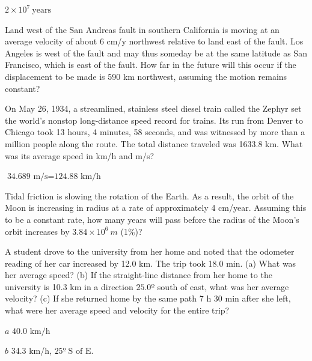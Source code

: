 \documentclass[
]{book}
\begin{document}
\leavevmode{}%
\({{2 \times \text{10}^{7}}\ \text{years}}{}\)

\hypertarget{fs-id2572316}{}
\leavevmode{}%
Land west of the San Andreas fault in southern California is moving at
an average velocity of about 6 cm/y northwest relative to land east of
the fault. Los Angeles is west of the fault and may thus someday be at
the same latitude as San Francisco, which is east of the fault. How far
in the future will this occur if the displacement to be made is 590 km
northwest, assuming the motion remains constant?

\hypertarget{fs-id1403452}{}
\leavevmode{}%
On May 26, 1934, a streamlined, stainless steel diesel train called the
Zephyr set the world's nonstop long-distance speed record for trains.
Its run from Denver to Chicago took 13 hours, 4 minutes, 58 seconds, and
was witnessed by more than a million people along the route. The total
distance traveled was 1633.8 km. What was its average speed in km/h and
m/s?

\leavevmode{}%
\(\text{34}\text{.}\text{689\ m/s} = \text{124}\text{.}\text{88\ km/h}\)

\hypertarget{fs-id951583}{}
\leavevmode{}%
Tidal friction is slowing the rotation of the Earth. As a result, the
orbit of the Moon is increasing in radius at a rate of approximately 4
cm/year. Assuming this to be a constant rate, how many years will pass
before the radius of the Moon's orbit increases by
\({3\text{.}{\text{84} \times \text{10}^{6}}\ m}{}\) (1\%)?

\hypertarget{fs-id1271475}{}
\leavevmode{}%
A student drove to the university from her home and noted that the
odometer reading of her car increased by 12.0 km. The trip took 18.0
min. (a) What was her average speed? (b) If the straight-line distance
from her home to the university is 10.3 km in a direction
\({\text{25}\text{.}0º}{}\) south of east, what was her average velocity?
(c) If she returned home by the same path 7 h 30 min after she left,
what were her average speed and velocity for the entire trip?

\leavevmode{}%
\(a\) \({\text{40}\text{.}\text{0\ km/h}}{}\)

\(b\) 34.3 km/h, \({\text{25º}\ \text{S\ of\ E}\text{.}}{}\)
\end{document}
